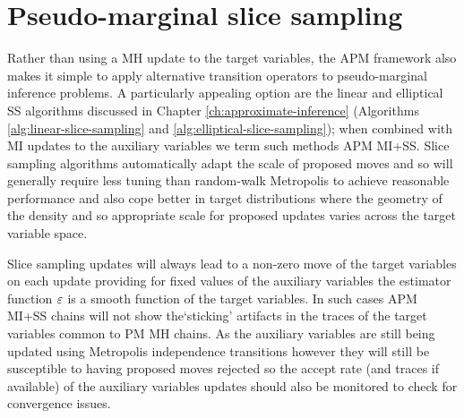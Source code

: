 
\section{Pseudo-marginal slice sampling}

Rather than using a \ac{MH} update to the target variables, the \ac{APM} framework also makes it simple to apply alternative transition operators to pseudo-marginal inference problems. A particularly appealing option are the linear and elliptical \ac{SS} algorithms discussed in Chapter \ref{ch:approximate-inference} (Algorithms \ref{alg:linear-slice-sampling} and \ref{alg:elliptical-slice-sampling}); when combined with \ac{MI} updates to the auxiliary variables we term such methods \ac{APM} \ac{MI}+\ac{SS}. Slice sampling algorithms automatically adapt the scale of proposed moves and so will generally require less tuning than random-walk Metropolis to achieve reasonable performance and also cope better in target distributions where the geometry of the density and so appropriate scale for proposed updates varies across the target variable space.

Slice sampling updates will always lead to a non-zero move of the target variables on each update providing for fixed values of the auxiliary variables the estimator function $\varepsilon$ is a smooth function of the target variables. In such cases \ac{APM} \ac{MI}+\ac{SS} chains will not show the`sticking' artifacts in the traces of the target variables common to \ac{PM} \ac{MH} chains. As the auxiliary variables are still being updated using Metropolis independence transitions however they will still be susceptible to having proposed moves rejected so the accept rate (and traces if available) of the auxiliary variables updates should also be monitored to check for convergence issues. %
	

